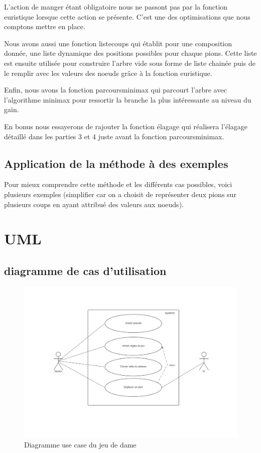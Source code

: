 \documentclass[12,french]{report}
\begin{document}
L'action de manger étant obligatoire nous ne passont pas par la fonction
euristique lorsque cette action se présente. C'est une des optimisations
que nous comptons mettre en place.

Nous avons aussi une fonction listecoups qui établit pour une composition
donnée, une liste dynamique des positions possibles pour chaque pions.
Cette liste est ensuite utilisée pour construire l'arbre vide sous
forme de liste chainée puis de le remplir avec les valeurs des noeuds
grâce à la fonction euristique.

Enfin, nous avons la fonction parcoursminimax qui parcourt l'arbre
avec l'algorithme minimax pour ressortir la branche la plus intéressante
au niveau du gain.

En bonus nous essayerons de rajouter la fonction élagage qui réalisera
l'élagage détaillé dans les parties 3 et 4 juste avant la fonction
parcoursminimax.


\section{Application de la méthode à des exemples}

Pour mieux comprendre cette méthode et les différents cas possibles,
voici plusieurs exemples (simplifier car on a choisit de représenter
deux pions sur plusieurs coups en ayant attribué des valeurs aux noeuds).

\chapter{UML}

\section{diagramme de cas d'utilisation}

\begin{figure}[H]
	\center
	\includegraphics[width=1\textwidth]{./Images/Diagramme_use_case}
	\caption{Diagramme use case du jeu de dame}
\end{figure}\vspace{0.2cm}
\end{document}
